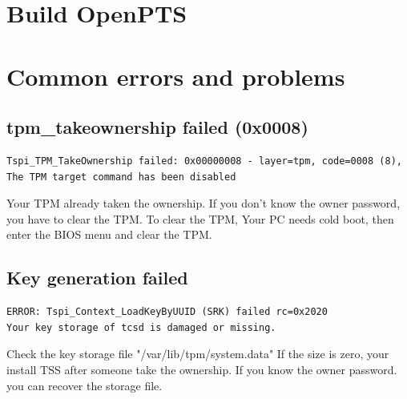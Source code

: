 \documentclass[10pt,a4paper]{article}
\begin{document}
\clearpage
\section{Build OpenPTS}



\section{Common errors and problems} 


\subsection{tpm\_takeownership failed (0x0008)} 

\begin{lstlisting}[style=source_code]
Tspi_TPM_TakeOwnership failed: 0x00000008 - layer=tpm, code=0008 (8), 
The TPM target command has been disabled
\end{lstlisting}

Your TPM already taken the ownership. 
If you don't know the owner password, you have to clear the TPM.
To clear the TPM, Your PC needs cold boot, then enter the BIOS menu and clear the TPM.

\subsection{Key generation failed} 

\begin{lstlisting}[style=source_code]
ERROR: Tspi_Context_LoadKeyByUUID (SRK) failed rc=0x2020
Your key storage of tcsd is damaged or missing. 
\end{lstlisting}

Check the key storage file "/var/lib/tpm/system.data"
If the size is zero, your install TSS after someone take the ownership.
If you know the owner password. you can recover the storage file.
\end{document}

